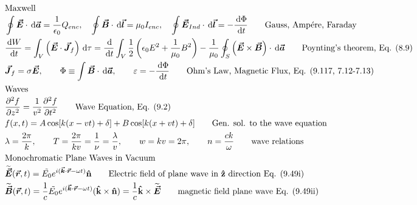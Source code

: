 \documentclass[10pt]{article}
\newcommand{\khat}{\boldsymbol{\hat{\textbf{k}}}}
\newcommand{\zhat}{\boldsymbol{\hat{\textbf{z}}}}
\newcommand{\nhat}{\boldsymbol{\hat{\textbf{n}}}}
\newcommand{\vect}[1]{\boldsymbol{\vec{#1}}}
\newcommand{\dd}{\, \mathrm{d}}
\newcommand{\tder}[2]{\frac{\dd #1}{\dd #2}}
\newcommand{\dpder}[2]{\frac{\partial^2 #1}{\partial #2^2}}
\newcommand{\wt}[1]{\widetilde{#1}}
\begin{document}
\begin{align*}
\intertext{Maxwell}
&\oint \vect{E} \cdot \dd \vect{a} = \frac{1}{\epsilon_0} Q_{enc}, \quad \oint \vect{B} \cdot \dd \vect{l} = \mu_0 I_{enc}, \quad \oint \vect{E}_{Ind} \cdot \dd \vect{l} = -\tder{\Phi}{t} \tag*{Gauss, Amp\'ere, Faraday}\\
& \tder{W}{t} = \int_V \left(\vect{E} \cdot \vect{J}_f \right) \dd \tau =  \tder{}{t} \int_V \frac{1}{2} \left(\epsilon_0 E^2 + \frac{1}{\mu_0} B^2\right) - \frac{1}{\mu_0} \oint_S \left(\vect{E} \times \vect{B}\right) \cdot \dd \vect{a} \tag*{Poynting's theorem, Eq. (8.9)}\\
&\vect{J}_f = \sigma \vect{E}, \qquad \Phi \equiv \int \vect{B} \cdot \dd \vect{a}, \qquad \varepsilon = -\tder{\Phi}{t} \tag*{Ohm's Law, Magnetic Flux, Eq. (9.117, 7.12-7.13)} \\
\intertext{Waves}
&\dpder{f}{z} = \frac{1}{v^2} \dpder{f}{t} \tag*{Wave Equation, Eq. (9.2)} \\
&f(x,t) = A\cos[k(x-vt) + \delta] + B \cos [k(x+vt) + \delta] \tag*{Gen. sol. to the wave equation}\\
&\lambda = \frac{2 \pi}{k}, \qquad T = \frac{2 \pi}{kv} = \frac{1}{\nu} = \frac{\lambda}{v}, \qquad w= kv =2 \pi, \qquad n = \frac{ck}{\omega}\tag*{wave relations} \\
\intertext{Monochromatic Plane Waves in Vacuum}
&\wt{\vect{E}}(\vect{r}, t) = \tilde{E_0}e^{i(\vect{k}\cdot \vect{r} - \omega t)} \nhat \tag*{Electric field of plane wave in $\zhat$ direction Eq. (9.49i)} \\
&\wt{\vect{B}}(\vect{r}, t) = \frac{1}{c}\tilde{E_0}e^{i(\vect{k}\cdot \vect{r} - \omega t)} (\khat \times \nhat) = \frac{1}{c}\khat \times \wt{\vect{E}} \tag*{magnetic field plane wave Eq. (9.49ii)} \\

\end{align*}
\end{document}
